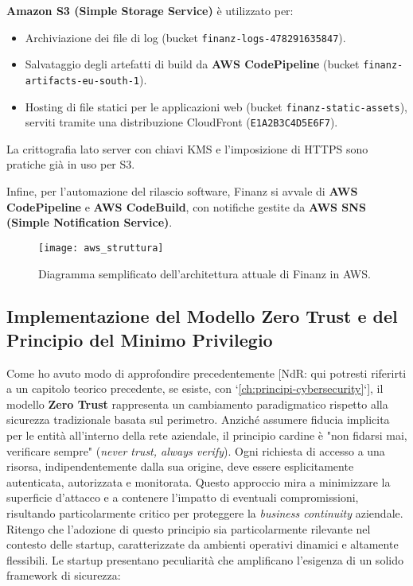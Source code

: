 \textbf{Amazon S3 (Simple Storage Service)} è utilizzato per:
\begin{itemize}
    \item Archiviazione dei file di log (bucket \texttt{finanz-logs-478291635847}).
    \item Salvataggio degli artefatti di build da \textbf{AWS CodePipeline} (bucket \texttt{finanz-artifacts-eu-south-1}).
    \item Hosting di file statici per le applicazioni web (bucket \texttt{finanz-static-assets}), serviti tramite una distribuzione CloudFront (\texttt{E1A2B3C4D5E6F7}).
\end{itemize}
La crittografia lato server con chiavi KMS e l'imposizione di HTTPS sono pratiche già in uso per S3.

Infine, per l'automazione del rilascio software, Finanz si avvale di \textbf{AWS CodePipeline} e \textbf{AWS CodeBuild}, con notifiche gestite da \textbf{AWS SNS (Simple Notification Service)}.

\begin{figure}[htbp]
  \centering
  \texttt{[image: aws\_struttura]} %
  \caption{Diagramma semplificato dell'architettura attuale di Finanz in AWS.}
  \label{fig:aws_struttura_attuale_cap2}
\end{figure}

\subsection{Implementazione del Modello Zero Trust e del Principio del Minimo Privilegio}
\label{sec:zero-trust-implementation}

Come ho avuto modo di approfondire precedentemente [NdR: qui potresti riferirti a un capitolo teorico precedente, se esiste, con `\ref{ch:principi-cybersecurity}`], il modello \textbf{Zero Trust} rappresenta un cambiamento paradigmatico rispetto alla sicurezza tradizionale basata sul perimetro. Anziché assumere fiducia implicita per le entità all'interno della rete aziendale, il principio cardine è "non fidarsi mai, verificare sempre" (\textit{never trust, always verify}). Ogni richiesta di accesso a una risorsa, indipendentemente dalla sua origine, deve essere esplicitamente autenticata, autorizzata e monitorata. Questo approccio mira a minimizzare la superficie d'attacco e a contenere l'impatto di eventuali compromissioni, risultando particolarmente critico per proteggere la \textit{business continuity} aziendale. Ritengo che l'adozione di questo principio sia particolarmente rilevante nel contesto delle startup, caratterizzate da ambienti operativi dinamici e altamente flessibili. Le startup presentano peculiarità che amplificano l'esigenza di un solido framework di sicurezza:

